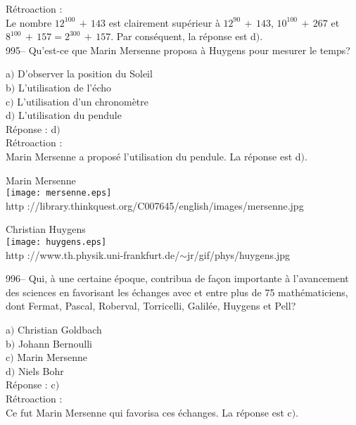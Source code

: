 ﻿\documentclass[letterpaper, 12pt]{article}
\begin{document}
R\'etroaction : \\
Le nombre $12^{100}\,+\,143$ est clairement sup\'erieur \`a
$12^{90}\,+\,143$, $10^{100}\,+\,267$ et
$8^{100}\,+\,157=2^{300}\,+\,157$.
Par cons\'equent, la r\'eponse est d$)$.\\

995-- Qu'est-ce que Marin Mersenne proposa \`a Huygens pour mesurer
le temps?

a$)$ D'observer la position du Soleil \\
b$)$ L'utilisation de l'\'echo \\
c$)$ L'utilisation d'un chronom\`etre \\
d$)$ L'utilisation du pendule\\

R\'eponse : d$)$\\

R\'etroaction : \\
Marin Mersenne a propos\'e l'utilisation du pendule.
La r\'eponse est d$)$.\\

        \begin{center}
        Marin Mersenne\\
    \texttt{[image: mersenne.eps]}\\
        {\footnotesize http
://library.thinkquest.org/C007645/english/images/mersenne.jpg}
    \end{center}

        \begin{center}
        Christian Huygens\\
    \texttt{[image: huygens.eps]}\\
        {\footnotesize http
://www.th.physik.uni-frankfurt.de/$\sim$jr/gif/phys/huygens.jpg}
    \end{center}

996-- Qui, \`a une certaine \'epoque, contribua de fa\c con importante \`a
l'avancement des sciences en favorisant
les \'echanges avec et entre plus de 75 math\'ematiciens, dont Fermat,
Pascal, Roberval, Torricelli, Galil\'ee, Huygens et Pell?

a$)$ Christian Goldbach \\
b$)$ Johann Bernoulli \\
c$)$ Marin Mersenne \\
d$)$ Niels Bohr \\

R\'eponse : c$)$\\

R\'etroaction : \\
Ce fut Marin Mersenne qui favorisa ces \'echanges.
La r\'eponse est c$)$.\\
\end{document}
